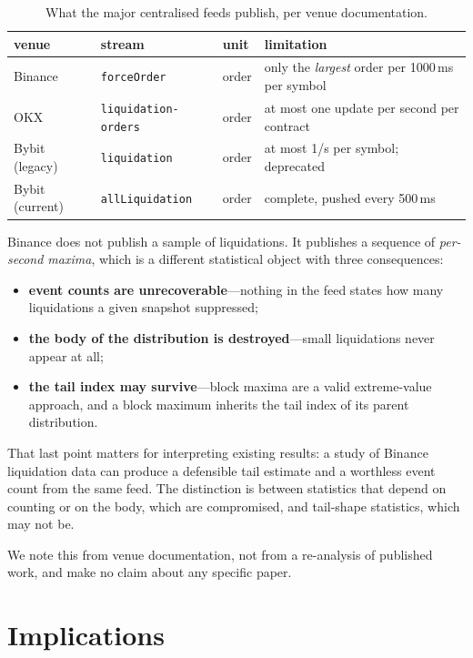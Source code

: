 \documentclass[11pt,a4paper]{article}
\begin{document}
\begin{table}[htbp]
\centering
\caption{What the major centralised feeds publish, per venue documentation.}
\label{tab:cex}
\small
\begin{tabular}{llll}
\toprule
venue & stream & unit & limitation \\
\midrule
Binance & \texttt{forceOrder} & order & only the \emph{largest} order per 1000\,ms per symbol \\
OKX & \texttt{liquidation-orders} & order & at most one update per second per contract \\
Bybit (legacy) & \texttt{liquidation} & order & at most 1/s per symbol; deprecated \\
Bybit (current) & \texttt{allLiquidation} & order & complete, pushed every 500\,ms \\
\bottomrule
\end{tabular}
\end{table}

Binance does not publish a sample of liquidations. It publishes a sequence of \emph{per-second
maxima}, which is a different statistical object with three consequences:

\begin{itemize}
\item \textbf{event counts are unrecoverable}---nothing in the feed states how many liquidations
      a given snapshot suppressed;
\item \textbf{the body of the distribution is destroyed}---small liquidations never appear at
      all;
\item \textbf{the tail index may survive}---block maxima are a valid extreme-value approach, and
      a block maximum inherits the tail index of its parent distribution.
\end{itemize}

That last point matters for interpreting existing results: a study of Binance liquidation data
can produce a defensible tail estimate and a worthless event count from the same feed. The
distinction is between statistics that depend on counting or on the body, which are compromised,
and tail-shape statistics, which may not be.

We note this from venue documentation, not from a re-analysis of published work, and make no
claim about any specific paper.

\section{Implications}
\end{document}
